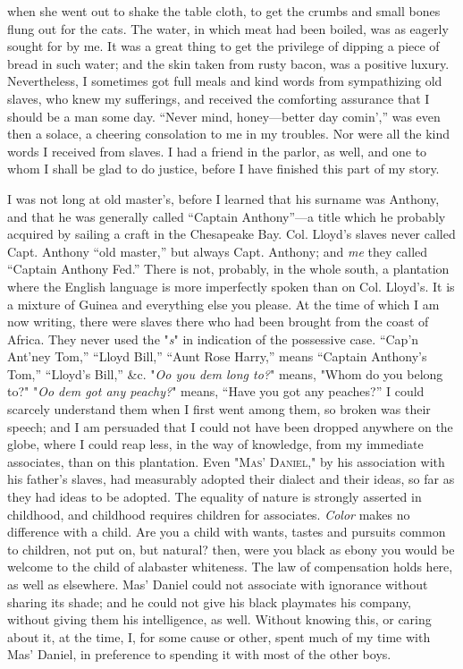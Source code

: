 when she went out to shake the table cloth, to get
{\protect\hypertarget{76}{}{}}the crumbs and small bones flung out for
the cats. The water, in which meat had been boiled, was as eagerly
sought for by me. It was a great thing to get the privilege of dipping a
piece of bread in such water; and the skin taken from rusty bacon, was a
positive luxury. Nevertheless, I sometimes got full meals and kind words
from sympathizing old slaves, who knew my sufferings, and received the
comforting assurance that I should be a man some day. ``Never mind,
honey---better day comin','' was even then a solace, a cheering
consolation to me in my troubles. Nor were all the kind words I received
from slaves. I had a friend in the parlor, as well, and one to whom I
shall be glad to do justice, before I have finished this part of my
story.

I was not long at old master's, before I learned that his surname was
Anthony, and that he was generally called ``Captain Anthony''---a title
which he probably acquired by sailing a craft in the Chesapeake Bay.
Col. Lloyd's slaves never called Capt. Anthony ``old master,'' but
always Capt. Anthony; and \emph{me} they called ``Captain Anthony Fed.''
There is not, probably, in the whole south, a plantation where the
English language is more imperfectly spoken than on Col. Lloyd's. It is
a mixture of Guinea and everything else you please. At the time of which
I am now writing, there were slaves there who had been brought from the
coast of Africa. They never used the "\emph{s}" in indication of the
possessive case. ``Cap'n Ant'ney Tom,'' ``Lloyd Bill,'' ``Aunt Rose
Harry,'' means ``Captain Anthony's Tom,'' ``Lloyd's Bill,'' \&c.
"\emph{Oo you dem long to?}" means, "Whom do you
{\protect\hypertarget{77}{}{}}belong to?" "\emph{Oo dem got any
peachy?}" means, ``Have you got any peaches?'' I could scarcely
understand them when I first went among them, so broken was their
speech; and I am persuaded that I could not have been dropped anywhere
on the globe, where I could reap less, in the way of knowledge, from my
immediate associates, than on this plantation. Even "\textsc{Mas'
Daniel}," by his association with his father's slaves, had measurably
adopted their dialect and their ideas, so far as they had ideas to be
adopted. The equality of nature is strongly asserted in childhood, and
childhood requires children for associates. \emph{Color} makes no
difference with a child. Are you a child with wants, tastes and pursuits
common to children, not put on, but natural? then, were you black as
ebony you would be welcome to the child of alabaster whiteness. The law
of compensation holds here, as well as elsewhere. Mas' Daniel could not
associate with ignorance without sharing its shade; and he could not
give his black playmates his company, without giving them his
intelligence, as well. Without knowing this, or caring about it, at the
time, I, for some cause or other, spent much of my time with Mas'
Daniel, in preference to spending it with most of the other boys.

